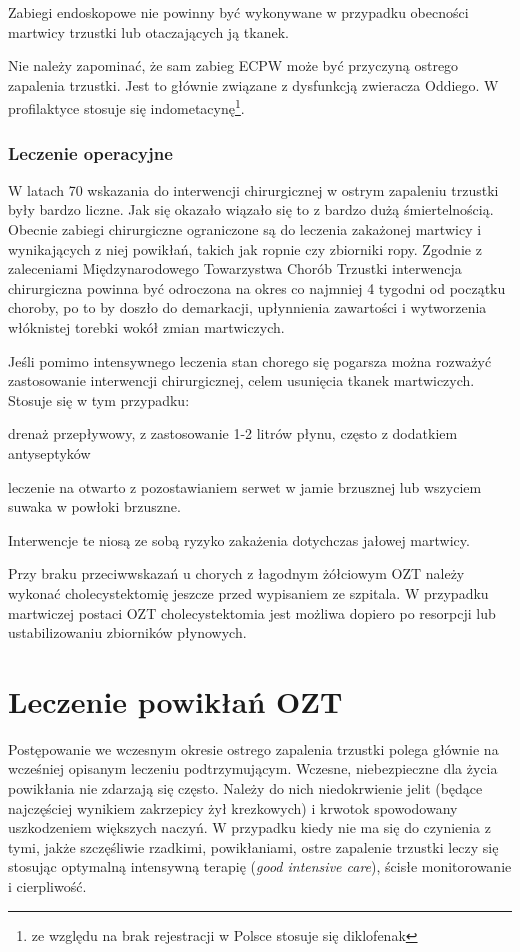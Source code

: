 \documentclass[a4paper, 12pt]{report}
\begin{document}
Zabiegi endoskopowe nie powinny być wykonywane w przypadku obecności
martwicy trzustki lub otaczających ją tkanek.

Nie należy zapominać, że sam zabieg ECPW może być przyczyną ostrego
zapalenia trzustki. Jest to głównie związane z dysfunkcją zwieracza
Oddiego. W profilaktyce stosuje się indometacynę\footnote{ze względu
  na brak rejestracji w Polsce stosuje się diklofenak}.

\subsubsection{Leczenie operacyjne}

W latach 70 wskazania do interwencji chirurgicznej w ostrym zapaleniu
trzustki były bardzo liczne. Jak się okazało wiązało się to z bardzo
dużą śmiertelnością. Obecnie zabiegi chirurgiczne ograniczone są do
leczenia zakażonej martwicy i wynikających z niej powikłań, takich jak
ropnie czy zbiorniki ropy. Zgodnie z zaleceniami Międzynarodowego
Towarzystwa Chorób Trzustki interwencja chirurgiczna powinna być
odroczona na okres co najmniej 4 tygodni od początku choroby, po to by
doszło do demarkacji, upłynnienia zawartości i wytworzenia włóknistej
torebki wokół zmian martwiczych.

Jeśli pomimo intensywnego leczenia stan chorego się pogarsza można
rozważyć zastosowanie interwencji chirurgicznej, celem usunięcia
tkanek martwiczych. Stosuje się w tym przypadku:
\begin{inparaenum}
\item drenaż przepływowy, z zastosowanie 1-2 litrów płynu, często z
  dodatkiem antyseptyków
\item leczenie na otwarto z pozostawianiem serwet w jamie brzusznej
  lub wszyciem suwaka w powłoki brzuszne.
\end{inparaenum}
Interwencje te niosą ze sobą ryzyko zakażenia dotychczas jałowej
martwicy.

Przy braku przeciwwskazań u chorych z łagodnym żółciowym OZT należy
wykonać cholecystektomię jeszcze przed wypisaniem ze szpitala. W
przypadku martwiczej postaci OZT cholecystektomia jest możliwa dopiero
po resorpcji lub ustabilizowaniu zbiorników płynowych.

\section{Leczenie powikłań OZT}

Postępowanie we wczesnym okresie ostrego zapalenia trzustki polega
głównie na wcześniej opisanym leczeniu podtrzymującym. Wczesne,
niebezpieczne dla życia powikłania nie zdarzają się często. Należy do
nich niedokrwienie jelit (będące najczęściej wynikiem zakrzepicy żył
krezkowych) i krwotok spowodowany uszkodzeniem większych naczyń. W
przypadku kiedy nie ma się do czynienia z tymi, jakże szczęśliwie
rzadkimi, powikłaniami, ostre zapalenie trzustki leczy się stosując
optymalną intensywną terapię (\textsl{good intensive care}), ścisłe
monitorowanie i cierpliwość.
\end{document}
